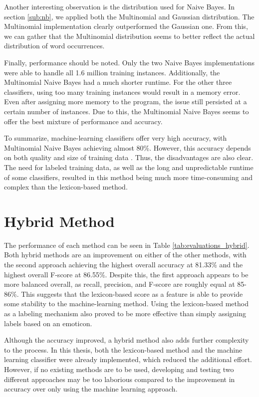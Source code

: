 Another interesting observation is the distribution used for Naive Bayes. In section \ref{sub:nb}, we applied both the Multinomial and Gaussian distribution. The Multinomial implementation clearly outperformed the Gaussian one. From this, we can gather that the Multinomial distribution seems to better reflect the actual distribution of word occurrences.

Finally, performance should be noted. Only the two Naive Bayes implementations were able to handle all 1.6 million training instances. Additionally, the Multinomial Naive Bayes had a much shorter runtime. For the other three classifiers, using too many training instances would result in a memory error. Even after assigning more memory to the program, the issue still persisted at a certain number of instances. Due to this, the Multinomial Naive Bayes seems to offer the best mixture of performance and accuracy.

To summarize, machine-learning classifiers offer very high accuracy, with Multinomial Naive Bayes achieving almost 80\%. However, this accuracy depends on both quality and size of training data \cite{DBLP:journals/csur/GiachanouC16}. Thus, the disadvantages are also clear. The need for labeled training data, as well as the long and unpredictable runtime of some classifiers, resulted in this method being much more time-consuming and complex than the lexicon-based method. 

\section{Hybrid Method}

The performance of each method can be seen in Table \ref{tab:evaluations_hybrid}. Both hybrid methods are an improvement on either of the other methods, with the second approach achieving the highest overall accuracy at 81.33\% and the highest overall F-score at 86.55\%. Despite this, the first approach appears to be more balanced overall, as recall, precision, and F-score are roughly equal at 85-86\%. This suggests that the lexicon-based score as a feature is able to provide some stability to the machine-learning method. Using the lexicon-based method as a labeling mechanism also proved to be more effective than simply assigning labels based on an emoticon. 

Although the accuracy improved, a hybrid method also adds further complexity to the process. In this thesis, both the lexicon-based method and the machine learning classifier were already implemented, which reduced the additional effort. However, if no existing methods are to be used, developing and testing two different approaches may be too laborious compared to the improvement in accuracy over only using the machine learning approach.

